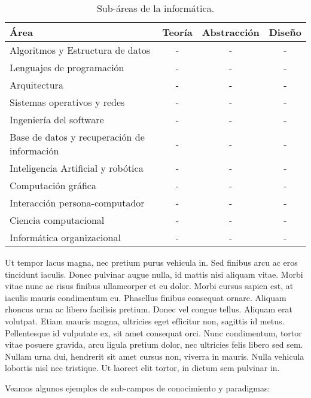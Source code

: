 \begin{table}[h]
\centering
\caption{Sub-áreas de la informática.}
\begin{tabular}[t]{lccc}
\hline
Área&Teoría&Abstracción&Diseño\\
\hline
Algoritmos y Estructura de datos&-&-&-\\
Lenguajes de programación&-&-&-\\
Arquitectura&-&-&-\\
Sistemas operativos y redes&-&-&-\\
Ingeniería del software&-&-&-\\
Base de datos y recuperación de información&-&-&-\\
Inteligencia Artificial y robótica&-&-&-\\
Computación gráfica&-&-&-\\
Interacción persona-computador&-&-&-\\
Ciencia computacional&-&-&-\\
Informática organizacional&-&-&-\\
\hline
\end{tabular}
\end{table}


Ut tempor lacus magna, nec pretium purus vehicula in. Sed finibus arcu ac eros tincidunt iaculis. Donec pulvinar augue nulla, id mattis nisi aliquam vitae. Morbi vitae nunc ac risus finibus ullamcorper et eu dolor. Morbi cursus sapien est, at iaculis mauris condimentum eu. Phasellus finibus consequat ornare. Aliquam rhoncus urna ac libero facilisis pretium. Donec vel congue tellus. Aliquam erat volutpat. Etiam mauris magna, ultricies eget efficitur non, sagittis id metus. Pellentesque id vulputate ex, sit amet consequat orci. Nunc condimentum, tortor vitae posuere gravida, arcu ligula pretium dolor, nec ultricies felis libero sed sem. Nullam urna dui, hendrerit sit amet cursus non, viverra in mauris. Nulla vehicula lobortis nisl nec tristique. Ut laoreet elit tortor, in dictum sem pulvinar in. 

Veamos algunos ejemplos de sub-campos de conocimiento y paradigmas:


